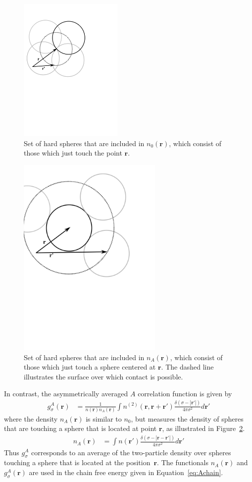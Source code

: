 \documentclass[letterpaper,amsmath,amssymb,10pt,pre]{revtex4-1}
\newcommand{\rr}{\textbf{r}}
\begin{document}
\begin{figure}
\includegraphics[width=5cm]{figs/n0}
\caption{Set of hard spheres that are included in $n_0(\mathbf{r})$, which
  consist of those which just touch the point $\mathbf{r}$.}
\label{fig:n0}
\end{figure}

\begin{figure}
\includegraphics[width=7cm]{figs/nA}
\caption{Set of hard spheres that are included in $n_A(\mathbf{r})$,
  which consist of those which just touch a sphere centered at
  $\mathbf{r}$.  The dashed line illustrates the surface over which
  contact is possible.}
\label{fig:nA}
\end{figure}

In contrast, the asymmetrically averaged $A$ correlation function is
given by
\begin{align}
  g^A_\sigma(\rr) &= \frac{1}{n(\rr)n_A(\rr)}
  \int n^{(2)}(\rr, \rr + \rr')
  \frac{\delta(\sigma -|\rr'|)}{4\pi\sigma^2}d\rr' \label{eq:gA}
\end{align}
where the density $n_A(\rr)$ is similar to $n_0$, but measures the
density of spheres that are touching a sphere that is located at
point $\rr$, as illustrated in Figure~\ref{fig:nA}.
\begin{align}
  n_A(\rr) &= \int n(\rr')
  \frac{\delta(\sigma -|\rr-\rr'|)}{4\pi\sigma^2} d\rr' \label{eq:nA}
\end{align}
Thus $g_\sigma^A$ corresponds to an average of the two-particle
density over spheres touching a sphere that is located at the
position~$\rr$.  The functionals $n_A(\rr)$ and $g_\sigma^A(\rr)$ are
used in the chain free energy given in Equation~\ref{eq:Achain}.
\end{document}
